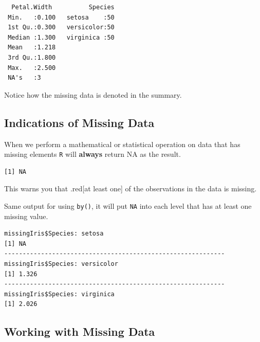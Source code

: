 \documentclass[
  letterpaper,
]{book}
\newenvironment{Shaded}{\begin{snugshade}}{\end{snugshade}}
\newcommand{\FunctionTok}[1]{\textcolor[rgb]{0.28,0.35,0.67}{#1}}
\newcommand{\NormalTok}[1]{\textcolor[rgb]{0.00,0.23,0.31}{#1}}
\newcommand{\SpecialCharTok}[1]{\textcolor[rgb]{0.37,0.37,0.37}{#1}}
\begin{document}
\begin{verbatim}
  Petal.Width          Species  
 Min.   :0.100   setosa    :50  
 1st Qu.:0.300   versicolor:50  
 Median :1.300   virginica :50  
 Mean   :1.218                  
 3rd Qu.:1.800                  
 Max.   :2.500                  
 NA's   :3                      
\end{verbatim}

Notice how the missing data is denoted in the summary.

\subsection{Indications of Missing
Data}\label{indications-of-missing-data}

When we perform a mathematical or statistical operation on data that has
missing elements \texttt{R} will \textbf{always} return NA as the
result.

\begin{Shaded}
\end{Shaded}

\begin{verbatim}
[1] NA
\end{verbatim}

This warns you that .red{[}at least one{]} of the observations in the
data is missing.

Same output for using \texttt{by()}, it will put \texttt{NA} into each
level that has at least one missing value.

\begin{Shaded}
\end{Shaded}

\begin{verbatim}
missingIris$Species: setosa
[1] NA
------------------------------------------------------------ 
missingIris$Species: versicolor
[1] 1.326
------------------------------------------------------------ 
missingIris$Species: virginica
[1] 2.026
\end{verbatim}

\subsection{Working with Missing Data}\label{working-with-missing-data}
\end{document}
